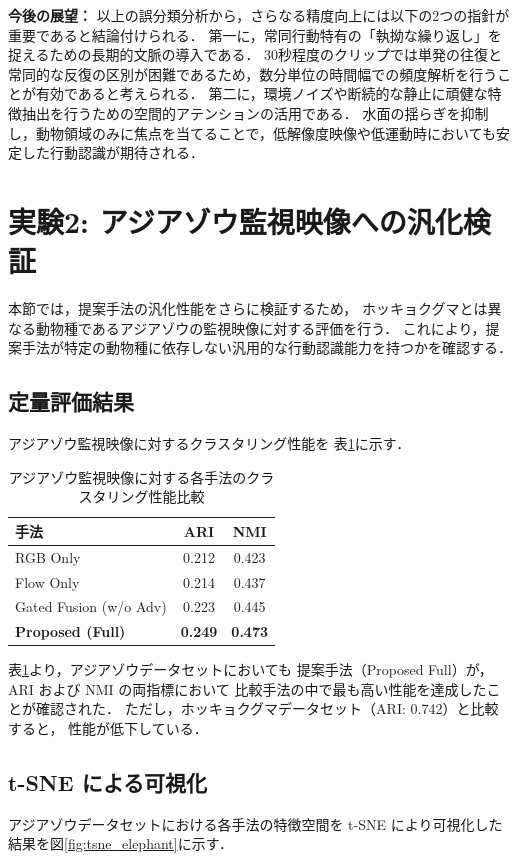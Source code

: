 \textbf{今後の展望：} 以上の誤分類分析から，さらなる精度向上には以下の2つの指針が重要であると結論付けられる．
第一に，常同行動特有の「執拗な繰り返し」を捉えるための長期的文脈の導入である．
30秒程度のクリップでは単発の往復と常同的な反復の区別が困難であるため，数分単位の時間幅での頻度解析を行うことが有効であると考えられる．
第二に，環境ノイズや断続的な静止に頑健な特徴抽出を行うための空間的アテンションの活用である．
水面の揺らぎを抑制し，動物領域のみに焦点を当てることで，低解像度映像や低運動時においても安定した行動認識が期待される．



\section{実験2: アジアゾウ監視映像への汎化検証}
本節では，提案手法の汎化性能をさらに検証するため，
ホッキョクグマとは異なる動物種であるアジアゾウの監視映像に対する評価を行う．
これにより，提案手法が特定の動物種に依存しない汎用的な行動認識能力を持つかを確認する．

\subsection{定量評価結果}
アジアゾウ監視映像に対するクラスタリング性能を
表\ref{tab:clustering_results_elephant}に示す．

\begin{table}[t]
  \centering
  \caption{アジアゾウ監視映像に対する各手法のクラスタリング性能比較}
  \label{tab:clustering_results_elephant}
  \begin{tabular}{lcc}
    \hline
    手法 & ARI & NMI \\
    \hline \hline
    RGB Only & 0.212 & 0.423 \\
    Flow Only & 0.214 & 0.437 \\
    Gated Fusion (w/o Adv) & 0.223 & 0.445 \\
    \textbf{Proposed (Full)} & \textbf{0.249} & \textbf{0.473} \\
    \hline
  \end{tabular}
\end{table}

表\ref{tab:clustering_results_elephant}より，アジアゾウデータセットにおいても
提案手法（Proposed Full）が，ARI および NMI の両指標において
比較手法の中で最も高い性能を達成したことが確認された．
ただし，ホッキョクグマデータセット（ARI: 0.742）と比較すると，
性能が低下している．

\subsection{t-SNE による可視化}
アジアゾウデータセットにおける各手法の特徴空間を t-SNE により可視化した結果を図\ref{fig:tsne_elephant}に示す．

